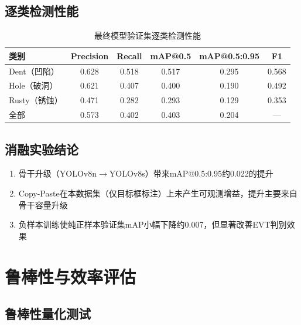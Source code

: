 \documentclass[12pt,a4paper]{ctexart}
\theoremstyle{cumcm}
\begin{document}
\subsection{逐类检测性能}

\begin{table}[H]
\centering
{}
\caption{最终模型验证集逐类检测性能}
\begin{tabular}{lccccc}
\toprule
\textbf{类别} & \textbf{Precision} & \textbf{Recall} & \textbf{mAP@0.5} & \textbf{mAP@0.5:0.95} & \textbf{F1} \\
\midrule
Dent（凹陷） & 0.628 & 0.518 & 0.517 & 0.295 & 0.568 \\
Hole（破洞） & 0.621 & 0.407 & 0.400 & 0.190 & 0.492 \\
Rusty（锈蚀） & 0.471 & 0.282 & 0.293 & 0.129 & 0.353 \\
\midrule
全部 & 0.573 & 0.402 & 0.403 & 0.204 & — \\
\bottomrule
\end{tabular}
\end{table}

\subsection{消融实验结论}

\begin{enumerate}[leftmargin=2.2em,itemsep=2pt]
\item 骨干升级（YOLOv8n$\to$YOLOv8s）带来mAP@0.5:0.95约0.022的提升
\item Copy-Paste在本数据集（仅目标框标注）上未产生可观测增益，提升主要来自骨干容量升级
\item 负样本训练使纯正样本验证集mAP小幅下降约0.007，但显著改善EVT判别效果
\end{enumerate}

\section{鲁棒性与效率评估}

\subsection{鲁棒性量化测试}
\end{document}

